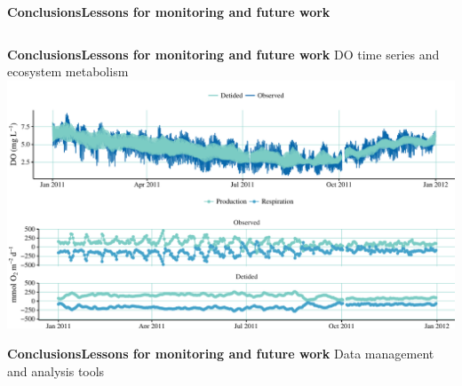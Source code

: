 \documentclass[serif]{beamer}\usepackage[]{graphicx}\usepackage[]{color}
\begin{document}
\begin{frame}{\textbf{Conclusions}}{\textbf{Lessons for monitoring and future work}}
\begin{columns}
\begin{column}{0.65\textwidth}
\end{column}
\end{columns}
\end{frame}



\begin{frame}{\textbf{Conclusions}}{\textbf{Lessons for monitoring and future work}}
DO time series and ecosystem metabolism \cite{Beck15b}
\includegraphics[width = \textwidth]{fig/metex.pdf}
\end{frame}

\begin{frame}{\textbf{Conclusions}}{\textbf{Lessons for monitoring and future work}}
Data management and analysis tools
\begin{center}
\end{center}
\end{frame}
\end{document}
